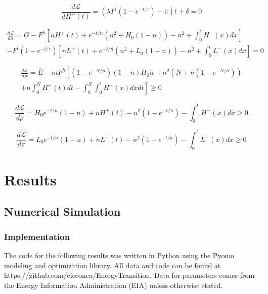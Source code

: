 \documentclass{easychithesis}
\newcommand{\Lagr}{\mathcal{L}}
\begin{document}
\begin{equation}\label{eq:dLdL-}
\frac{d\Lagr}{dH^-(t)} = (\lambda F^l(1-e^{-t/\tau}) - \pi)t + \delta = 0
\end{equation}

\begin{multline}\label{eq:dLdlambda}
\frac{d\Lagr}{d\lambda} = G - F^h\left[nH^+(t) + e^{-t/n}(n^2 + H_0(1-n)) - n^2 + \int_0^tH^-(x)dx\right] \\ - F^l (1-e^{-t/\tau})\left[nL^+(t) + e^{-t/n}(n^2 + L_0(1-n)) - n^2 + \int_0^tL^-(x)dx\right] = 0
\end{multline}

\begin{multline}\label{eq:dLdmu}
\frac{d\Lagr}{d\mu} = \bar{E} - mF^h \left [(1-e^{-N/n})(1-n)H_0 n + n^2(N + n(1-e^{-N/n})) \right.\\ + \left. n\int_0^N H^+(t) dt - \int_0^N\int_0^t H^-(x)dx dt   \right] \geq 0
\end{multline}

\begin{equation}\label{eq:dLdrho}
\frac{d\Lagr}{d\rho} = H_0 e^{-t/n}(1-n) + nH^+(t) - n^2(1-e^{-t/n}) - \int_0^t H^-(x)dx \geq 0 
\end{equation}

\begin{equation}\label{eq:dLdpi}
\frac{d\Lagr}{d\pi} = L_0 e^{-t/n}(1-n) + nL^+(t) - n^2(1-e^{-t/n}) - \int_0^t L^-(x)dx \geq 0 
\end{equation}





\chapter{Results}
\section{Numerical Simulation}

\subsection{Implementation}
The code for the following results was written in Python using the Pyomo modeling and optimization library. All data and code can be found at \\ https://github.com/cicconea/EnergyTransition. Data for parameters comes from the Energy Information Administration (EIA) unless otherwise stated.  
\end{document}
